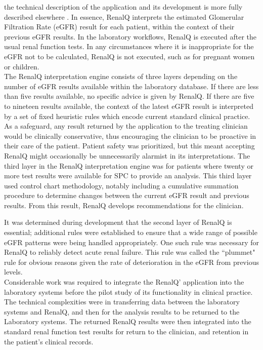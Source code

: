 ﻿\documentclass[11pt]{article}
\begin{document}
the technical description of the application and its development is more fully described elsewhere \citep{GodfreyEtAl2014KidneyPaper}. In essence, RenalQ interprets the estimated Glomerular Filtration Rate (eGFR) result for each patient, within the context of their previous eGFR results. In the laboratory workflows, RenalQ is executed after the usual renal function tests. In any circumstances where it is inappropriate for the eGFR not to be calculated, RenalQ is not executed, such as for pregnant women or children. \\

The RenalQ interpretation engine consists of three layers depending on the number of eGFR results available within the laboratory database. If there are less than five results available, no specific advice is given by RenalQ. If there are five to nineteen  results available, the context of the latest eGFR result is interpreted by a set of fixed heuristic rules which encode current standard clinical practice. As a safeguard, any result returned by the application to the treating clinician would be clinically conservative, thus encouraging the  clinician to be proactive in their care of the patient. Patient safety was prioritized, but this meant accepting RenalQ might occasionally be unnecessarily alarmist in its interpretations. The third layer in the RenalQ interpretation engine was for patients where twenty  or more test results were available for SPC to provide an analysis. This third layer used control chart methodology, notably including a cumulative summation procedure to determine changes between the current eGFR result and previous results. From this result, RenalQ develops recommendations for the clinician.  

It was determined during development that the second layer of RenalQ is essential; additional rules were established to ensure that a wide range of possible eGFR patterns were being handled appropriately.  One such rule was necessary for RenalQ to reliably detect acute renal failure. This rule was called the ``plummet" rule for obvious reasons given the rate of deterioration in the eGFR from previous levels. \\

Considerable work was required to integrate the RenalQ' application into the laboratory systems before the pilot study of its functionality in clinical practice.  The technical complexities were in transferring data between the laboratory systems and RenalQ,  and then for the analysis results to be returned to the Laboratory systems.  The returned RenalQ results were then integrated into the standard renal function test results for return to the clinician, and retention in the patient's clinical records. \\
\end{document}
